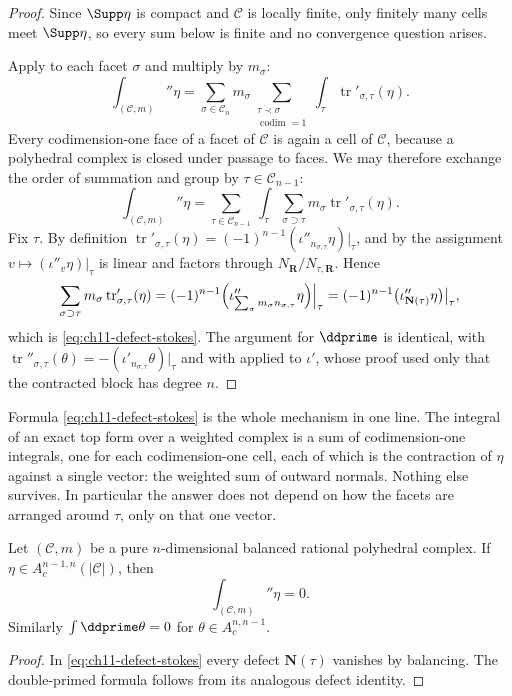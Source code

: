 \begin{proof}
Since $\Supp\eta$ is compact and $\mathscr C$ is locally finite, only
finitely many cells meet $\Supp\eta$, so every sum below is finite and no
convergence question arises.

Apply  to each facet $\sigma$ and multiply
by $m_\sigma$:
\[
 \int_{(\mathscr C,m)}\dprime\eta
 =\sum_{\sigma\in\mathscr C_n}m_\sigma
   \sum_{\substack{\tau\prec\sigma\\ \operatorname{codim}=1}}
   \int_\tau\operatorname{tr}'_{\sigma,\tau}(\eta).
\]
Every codimension-one face of a facet of $\mathscr C$ is again a cell of
$\mathscr C$, because a polyhedral complex is closed under passage to faces.
We may therefore exchange the order of summation and group by
$\tau\in\mathscr C_{n-1}$:
\[
 \int_{(\mathscr C,m)}\dprime\eta
 =\sum_{\tau\in\mathscr C_{n-1}}\ \int_\tau
  \sum_{\sigma\supset\tau}m_\sigma
   \operatorname{tr}'_{\sigma,\tau}(\eta).
\]
Fix $\tau$.  By definition
$\operatorname{tr}'_{\sigma,\tau}(\eta)
=(-1)^{n-1}(\iota''_{n_{\sigma,\tau}}\eta)|_\tau$, and by
 the assignment
$v\mapsto(\iota''_v\eta)|_\tau$ is linear and factors through
$N_{\mathbf R}/N_{\tau,\mathbf R}$.  Hence
\[
 \sum_{\sigma\supset\tau}m_\sigma\operatorname{tr}'_{\sigma,\tau}(\eta)
 =(-1)^{n-1}\Bigl(\iota''_{\sum_\sigma m_\sigma n_{\sigma,\tau}}
    \eta\Bigr)\Big|_\tau
 =(-1)^{n-1}\bigl(\iota''_{\mathbf N(\tau)}\eta\bigr)\big|_\tau ,
\]
which is \eqref{eq:ch11-defect-stokes}.  The argument for $\ddprime$ is
identical, with $\operatorname{tr}''_{\sigma,\tau}(\theta)
=-(\iota'_{n_{\sigma,\tau}}\theta)|_\tau$ and with
 applied to $\iota'$, whose proof used only
that the contracted block has degree $n$.
\end{proof}

Formula \eqref{eq:ch11-defect-stokes} is the whole mechanism in one line.
The integral of an exact top form over a weighted complex is a sum of
codimension-one integrals, one for each codimension-one cell, each of which
is the contraction of $\eta$ against a single vector: the weighted sum of
outward normals.  Nothing else survives.  In particular the answer does not
depend on how the facets are arranged around $\tau$, only on that one
vector.

\begin{theorem}\label{thm:balanced-stokes}
Let $(\mathscr C,m)$ be a pure $n$-dimensional balanced rational polyhedral
complex. If $\eta\in A^{n-1,n}_c(|\mathscr C|)$, then
\[
                         \int_{(\mathscr C,m)}\dprime\eta=0.
\]
Similarly $\int \ddprime\theta=0$ for
$\theta\in A^{n,n-1}_c$.
\end{theorem}
\begin{proof}
In \eqref{eq:ch11-defect-stokes} every defect $\mathbf N(\tau)$ vanishes by
balancing.  The double-primed formula follows from its analogous defect
identity.
\end{proof}

